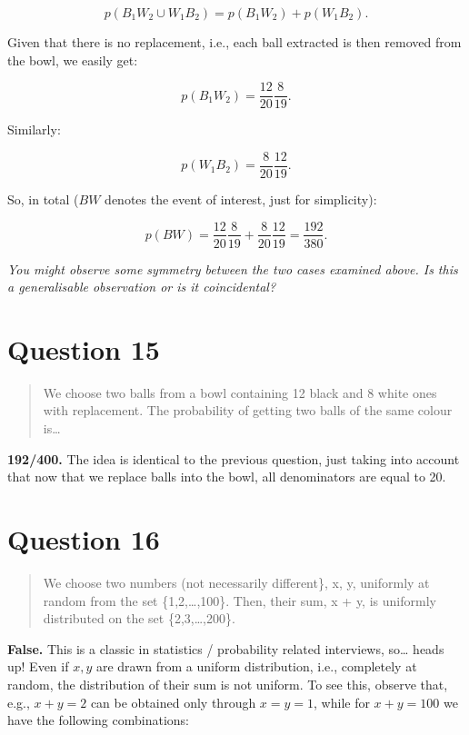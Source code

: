 \documentclass[
]{article}
\begin{document}
\[p(B_1W_2\cup W_1B_2)=p(B_1W_2)+p(W_1B_2).\]

Given that there is no replacement, i.e., each ball extracted is then
removed from the bowl, we easily get:

\[p(B_1W_2)=\frac{12}{20}\frac{8}{19}.\]

Similarly:

\[p(W_1B_2)=\frac{8}{20}\frac{12}{19}.\]

So, in total (\(BW\) denotes the event of interest, just for
simplicity):

\[p(BW)=\frac{12}{20}\frac{8}{19}+\frac{8}{20}\frac{12}{19}=\frac{192}{380}.\]

\emph{You might observe some symmetry between the two cases examined
above. Is this a generalisable observation or is it coincidental?}

\section{Question 15}\label{question-15}

\begin{quote}
We choose two balls from a bowl containing 12 black and 8 white ones
with replacement. The probability of getting two balls of the same
colour is\ldots{}
\end{quote}

\textbf{192/400.} The idea is identical to the previous question, just
taking into account that now that we replace balls into the bowl, all
denominators are equal to 20.

\section{Question 16}\label{question-16}

\begin{quote}
We choose two numbers (not necessarily different\}, x, y, uniformly at
random from the set \{1,2,\ldots,100\}. Then, their sum, x + y, is
uniformly distributed on the set \{2,3,\ldots,200\}.
\end{quote}

\textbf{False.} This is a classic in statistics / probability related
interviews, so\ldots{} heads up! Even if \(x,y\) are drawn from a
uniform distribution, i.e., completely at random, the distribution of
their sum is not uniform. To see this, observe that, e.g., \(x+y=2\) can
be obtained only through \(x=y=1\), while for \(x+y=100\) we have the
following combinations:
\end{document}
